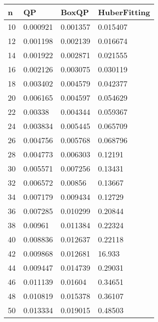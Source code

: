 \begin{tabular}{llll}
n & QP & BoxQP & HuberFitting \\ 
\hline 
10 & 0.000921 & 0.001357 & 0.015407 \\ 
12 & 0.001198 & 0.002139 & 0.016674 \\ 
14 & 0.001922 & 0.002871 & 0.021555 \\ 
16 & 0.002126 & 0.003075 & 0.030119 \\ 
18 & 0.003402 & 0.004579 & 0.042377 \\ 
20 & 0.006165 & 0.004597 & 0.054629 \\ 
22 & 0.00338 & 0.004344 & 0.059367 \\ 
24 & 0.003834 & 0.005445 & 0.065709 \\ 
26 & 0.004756 & 0.005768 & 0.068796 \\ 
28 & 0.004773 & 0.006303 & 0.12191 \\ 
30 & 0.005571 & 0.007256 & 0.13431 \\ 
32 & 0.006572 & 0.00856 & 0.13667 \\ 
34 & 0.007179 & 0.009434 & 0.12729 \\ 
36 & 0.007285 & 0.010299 & 0.20844 \\ 
38 & 0.00961 & 0.011384 & 0.22324 \\ 
40 & 0.008836 & 0.012637 & 0.22118 \\ 
42 & 0.009868 & 0.012681 & 16.933 \\ 
44 & 0.009447 & 0.014739 & 0.29031 \\ 
46 & 0.011139 & 0.01604 & 0.34651 \\ 
48 & 0.010819 & 0.015378 & 0.36107 \\ 
50 & 0.013334 & 0.019015 & 0.48503 \\ 
\hline 
\end{tabular}